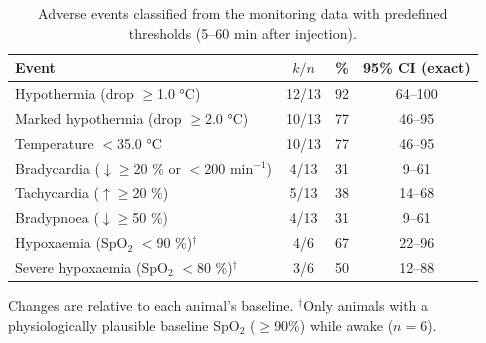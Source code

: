 \begin{table}[p]
\centering
\caption{Adverse events classified from the monitoring data with predefined thresholds (5--60 min after injection).}
\label{tab:adverse}
\small
\begin{tabular}{lccc}
\toprule
Event & $k/n$ & \% & 95\% CI (exact) \\
\midrule
Hypothermia (drop $\geq$1.0 \si{\celsius}) & 12/13 & 92 & 64--100 \\
Marked hypothermia (drop $\geq$2.0 \si{\celsius}) & 10/13 & 77 & 46--95 \\
Temperature $<$35.0 \si{\celsius} & 10/13 & 77 & 46--95 \\
Bradycardia ($\downarrow$$\geq$20 \% or $<$200 min$^{-1}$) & 4/13 & 31 & 9--61 \\
Tachycardia ($\uparrow$$\geq$20 \%) & 5/13 & 38 & 14--68 \\
Bradypnoea ($\downarrow$$\geq$50 \%) & 4/13 & 31 & 9--61 \\
Hypoxaemia (SpO$_2$ $<$90 \%)$^{\dagger}$ & 4/6 & 67 & 22--96 \\
Severe hypoxaemia (SpO$_2$ $<$80 \%)$^{\dagger}$ & 3/6 & 50 & 12--88 \\
\bottomrule
\end{tabular}
\par\smallskip\footnotesize Changes are relative to each animal's baseline. $^{\dagger}$Only animals with a physiologically plausible baseline SpO$_2$ ($\geq$90\%) while awake ($n=6$).
\end{table}
